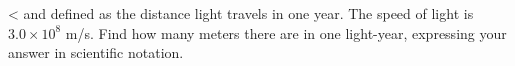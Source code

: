 <%
and defined as the distance light travels in one year.  The
speed of light is $3.0\times10^8$  m/s.  Find how many
meters there are in one light-year, expressing your answer
in scientific notation.

